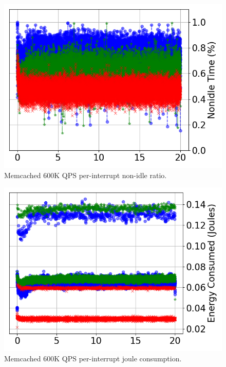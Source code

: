 \begin{figure}[t]
	\includegraphics[width=\columnwidth]{osdi_figures/mcd_600000_nonidle_timeline.png}
	\caption{Memcached 600K QPS per-interrupt non-idle ratio.}
	\label{fig:mcd_600000_nonidle}
\end{figure}

\begin{figure}[t]
	\includegraphics[width=\columnwidth]{osdi_figures/mcd_600000_joules_timeline.png}
	\caption{Memcached 600K QPS per-interrupt joule consumption.}
	\label{fig:mcd_600000_joule}
\end{figure}


